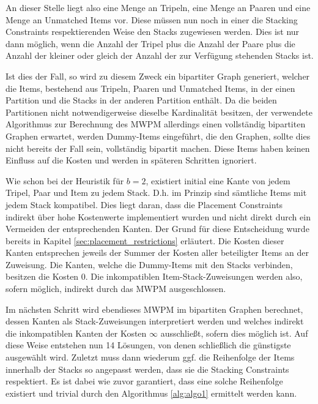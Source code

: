 An dieser Stelle liegt also eine Menge an Tripeln, eine Menge an Paaren und eine Menge an Unmatched Items vor. Diese müssen nun
noch in einer die Stacking Constraints respektierenden Weise den Stacks zugewiesen werden.
Dies ist nur dann möglich, wenn die Anzahl der Tripel plus die Anzahl der Paare plus die Anzahl der  kleiner
oder gleich der Anzahl der zur Verfügung stehenden Stacks ist.

Ist dies der Fall, so wird zu diesem Zweck ein bipartiter Graph generiert, welcher die Items, bestehend aus Tripeln, Paaren und Unmatched Items, in der einen Partition und die Stacks in der anderen Partition enthält.
Da die beiden Partitionen nicht notwendigerweise dieselbe Kardinalität besitzen, der verwendete Algorithmus zur Berechnung des \textsc{MWPM} allerdings einen vollständig bipartiten Graphen erwartet, werden Dummy-Items eingeführt, die den Graphen, sollte dies nicht bereits der Fall sein, vollständig bipartit machen. Diese Items haben keinen Einfluss auf die Kosten und werden in späteren Schritten ignoriert.

Wie schon bei der Heuristik für $b = 2$, existiert initial eine Kante von jedem Tripel, Paar und Item zu jedem Stack. D.h. im Prinzip sind sämtliche Items mit jedem Stack kompatibel. Dies liegt daran, dass die Placement Constraints indirekt über hohe Kostenwerte implementiert wurden und nicht direkt durch ein Vermeiden der entsprechenden Kanten. Der Grund für diese Entscheidung wurde bereits in Kapitel \ref{sec:placement_restrictions} erläutert. Die Kosten dieser Kanten entsprechen jeweils der Summer der Kosten aller beteiligter Items an der Zuweisung. Die Kanten, welche die Dummy-Items mit den Stacks verbinden, besitzen die Kosten $0$.
Die inkompatiblen Item-Stack-Zuweisungen werden also, sofern möglich, indirekt durch das \textsc{MWPM} ausgeschlossen.

Im nächsten Schritt wird ebendieses \textsc{MWPM} im bipartiten Graphen berechnet, dessen Kanten
als Stack-Zuweisungen interpretiert werden und welches indirekt die inkompatiblen Kanten der Kosten $\infty$
ausschließt, sofern dies möglich ist. Auf diese Weise entstehen nun 14 Lösungen, von denen schließlich die günstigste ausgewählt wird.
Zuletzt muss dann wiederum ggf. die Reihenfolge der Items innerhalb der Stacks so angepasst werden,
dass sie die Stacking Constraints respektiert. Es ist dabei wie zuvor garantiert, dass eine solche
Reihenfolge existiert und trivial durch den Algorithmus \ref{alg:algo1} ermittelt werden kann.

